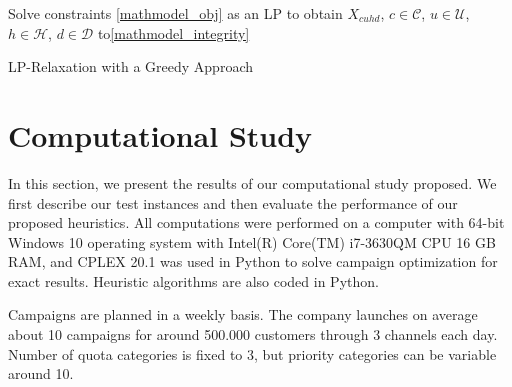 \documentclass[11pt]{article}
\begin{document}
\begin{singlespace}
\begin{algorithm}[H]
\DontPrintSemicolon
{}

Solve constraints \eqref{mathmodel_obj} as an LP to obtain $X_{{c}{u}{h}{d}}$,  $c\in\mathcal{C}$, $u\in\mathcal{U}$, $h\in\mathcal{H}$, $d\in\mathcal{D}$ to\eqref{mathmodel_integrity}

\;
\caption{LP-Relaxation with a Greedy Approach}
\label{algo:lprelax}
\end{algorithm}
\end{singlespace}

\newpage
\section{Computational Study} \label{s:num-analysis}

In this section, we present the results of our computational study proposed. We first describe our test instances and then evaluate the performance of our proposed heuristics. All computations were performed on a computer with 64-bit Windows 10 operating system with Intel(R) Core(TM) i7-3630QM CPU 16 GB RAM, and CPLEX 20.1 was used in Python to solve campaign optimization for exact results. Heuristic algorithms are also coded in Python.

Campaigns are planned in a weekly basis. The company launches on average about 10 campaigns for around 500.000 customers through 3 channels each day. Number of quota categories is fixed to 3, but priority categories can be variable around 10.
\end{document}
